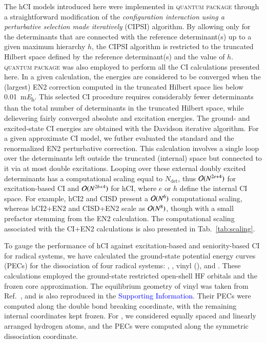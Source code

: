 \documentclass[aip,jcp,reprint,noshowkeys,superscriptaddress]{revtex4-1}
\newcommand{\SupInf}{\textcolor{blue}{Supporting Information}}
\newcommand{\QP}{\textsc{quantum package}}
\newcommand{\Ndet}{N_\text{det}}
\begin{document}
The hCI models introduced here were implemented in {\QP} \cite{Garniron_2019} through a straightforward modification of the
\textit{configuration interaction using a perturbative selection made iteratively} (CIPSI) algorithm. \cite{Huron_1973,Giner_2013,Giner_2015,Garniron_2018}
By allowing only for the determinants that are connected with the reference determinant(s) up to a given maximum hierarchy $h$,
the CIPSI algorithm is restricted to the truncated Hilbert space defined by the reference determinant(s) and the value of $h$.
{\QP} \cite{Garniron_2019} was also employed to perform all the CI calculations presented here.
In a given calculation, the energies are considered to be converged when the (largest) EN2 correction computed in the truncated Hilbert space 
lies below \SI{0.01}{\milli\hartree}. \cite{Garniron_2018}
This selected CI procedure requires considerably fewer determinants than the total number of determinants in the truncated Hilbert space,
while delievering fairly converged absolute and excitation energies.
The ground- and excited-state CI energies are obtained with the Davidson iterative algorithm. \cite{Davidson_1975}
For a given approximate CI model, we futher evaluated the standard and the renormalized EN2 perturbative correction. \cite{Garniron_2019} 
This calculation involves a single loop over the determinants left outside the truncated (internal) space but connected to it via at most double excitations.
Looping over these external doubly excited determinants has a computational scaling equal to $\Ndet$,
thus $\order*{N^{2e+4}}$ for excitation-based CI and $\order*{N^{2h+4}}$ for hCI, where $e$ or $h$ define the internal CI space.
For example, hCI2 and CISD present a $\order*{N^6}$ computational scaling, whereas hCI2+EN2 and CISD+EN2 scale as $\order*{N^8}$,
though with a small prefactor stemming from the EN2 calculation.
The computational scaling associated with the CI+EN2 calculations is also presented in Tab.~\ref{tab:scaling}.

To gauge the performance of hCI against excitation-based and seniority-based CI for radical systems,
we have calculated the ground-state potential energy curves (PECs) for the dissociation of four radical systems:
, , vinyl (), and .
These calculations employed the ground-state restricted open-shell HF orbitals and the frozen core approximation.
The equilibrium geometry of vinyl was taken from Ref.~,
and is also reproduced in the {\SupInf}.
Their PECs were computed along the  double bond breaking coordinate, with the remaining internal coordinates kept frozen.
For , we considered equally spaced and linearly arranged hydrogen atoms, and the PECs were computed along the symmetric dissociation coordinate.
\end{document}
